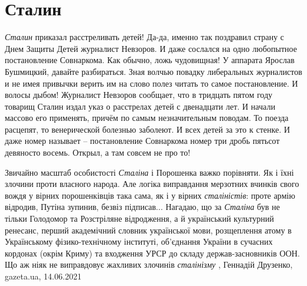  
 
 
 
 
\chapter{Сталин}

\emph{Сталин} приказал расстреливать детей! Да-да, именно так поздравил страну с Днем
Защиты Детей журналист Невзоров. И даже сослался на одно любопытное
постановление Совнаркома. Как обычно, ложь чудовищная!  У аппарата Ярослав
Бушмицкий, давайте разбираться. Зная волчью повадку либеральных журналистов и
не имея привычки верить им на слово полез читать то самое постановление. И
волосы дыбом!  Журналист Невзоров сообщает, что в тридцать пятом году товарищ
Сталин издал указ о расстрелах детей с двенадцати лет. И начали массово его
применять, причём по самым незначительным поводам. То поезда расцепят, то
венерической болезнью заболеют. И всех детей за это к стенке. И даже номер
называет – постановление Совнаркома номер три дробь пятьсот девяносто восемь.
Открыл, а там совсем не про то!

Звичайно масштаб особистості \emph{Сталіна} і Порошенка важко порівняти. Як і їхні
злочини проти власного народа. Але логіка виправдання мерзотних вчинків свого
вождя у вірних порошенківців така сама, як і у вірних \emph{сталіністів}: проте армію
відродив, Путіна зупинив, безвіз підписав... Нагадаю, що за \emph{Сталіна} був не
тільки Голодомор та Розстріляне відродження, а й український культурний
ренесанс, перший академічний словник української мови, розщеплення атому в
Українському фізико-технічному інституті, об'єднання України в сучасних
кордонах (окрім Криму) та входження УРСР до складу держав-засновників ООН. Що
аж ніяк не виправдовує жахливих злочинів \emph{сталінізму}
, 
Геннадій Друзенко, gazeta.ua, 14.06.2021

